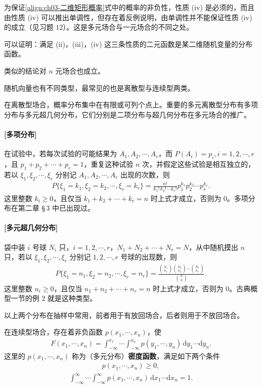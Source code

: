 \documentclass[../../main.tex]{subfiles}
\begin{document}
为保证\eqref{align:ch03-二维矩形概率}式中的概率的非负性，性质 (iv) 是必须的，而且由性质 (iv) 可以推出单调性，但存在着反例说明，由单调性并不能保证性质 (iv) 的成立（见习题 $12$）。这是多元场合与一元场合的不同之处。

可以证明：满足 (ii)，(iii)，(iv) 这三条性质的二元函数是某二维随机变量的分布函数。

类似的结论对 $n$ 元场合也成立。

随机向量也有不同类型，最常见的也是离散型与连续型两类。

在离散型场合，概率分布集中在有限或可列个点上。重要的多元离散型分布有多项分布与多元超几何分布，它们分别是二项分布与超几何分布在多元场合的推广。

\paragraph{[多项分布]}在试验中，若每次试验的可能结果为 $A_1,A_2,\cdots,A_r$，而 $P(A_i)=p_i,i=1,2,\cdots,r$，且 $p_1+p_2+\cdots+p_r=1$，重复这种试验 $n$ 次，并假定这些试验是相互独立的，若以 $\xi_1,\xi_2,\cdots,\xi_r$ 分别记 $A_1,A_2,\cdots,A_r$ 出现的次数，则
\begin{align}
P\{\xi_1=k_1,\xi_2=k_2,\cdots,\xi_r=k_r\}=\frac{n!}{k_1!\,k_2!\,\cdots k_r!}p_1^{k_1}p_2^{k_2}\cdots p_r^{k_r}.\label{align:ch03-多项分布}
\end{align}
这里整数 $k_i\geqslant 0$，且仅当 $k_1+k_2+\cdots+k_r=n$ 时上式才成立，否则为 $0$。多项分布在第二章 \S\,3 中已出现过。

\paragraph{[多元超几何分布]}袋中装 $i$ 号球 $N_i$ 只，$i=1,2,\cdots,r$，$N_1+N_2+\cdots+N_r=N$，从中随机摸出 $n$ 只，若以 $\xi_1,\xi_2,\cdots,\xi_r$ 分别记 $1,2,\cdots,r$ 号球的出现数，则
\begin{align}
P\{\xi_1=n_1,\xi_2=n_2,\cdots,\xi_r=n_r\}=\frac{\binom{N_1}{n_1}\binom{N_2}{n_2}\cdots\binom{N_r}{n_r}}{\binom{N}{n}}.\label{align:ch03-多元超几何}
\end{align}
这里整数 $n_i\geqslant 0$，且仅当 $n_1+n_2+\cdots+n_r=n$ 时上式才成立，否则为 $0$。古典概型一节的例 $2$ 就是这种类型。

以上两个分布在抽样中常用，前者用于有放回场合，后者则用于不放回场合。

在连续型场合，存在着非负函数 $p(x_1,\cdots,x_n)$，使
\begin{align}
F(x_1,\cdots,x_n)=\int_{-\infty}^{x_1}\cdots\int_{-\infty}^{x_n}p(y_1,\cdots,y_n)\,\mathrm{d}y_1\cdots\mathrm{d}y_n.\label{align:ch03-多元连续分布函数}
\end{align}
这里的 $p(x_1,\cdots,x_n)$ 称为（多元分布）\textbf{密度函数}，满足如下两个条件
\begin{align}
p(x_1,\cdots,x_n)\geqslant 0,\label{align:ch03-多元密度非负}
\end{align}
\begin{align}
\int_{-\infty}^{\infty}\cdots\int_{-\infty}^{\infty}p(x_1,\cdots,x_n)\,\mathrm{d}x_1\cdots\mathrm{d}x_n=1.\label{align:ch03-多元密度归一}
\end{align}
\end{document}
